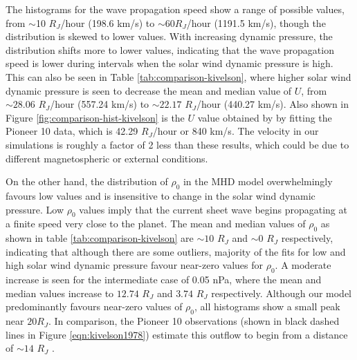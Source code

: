 The histograms for the wave propagation speed show a range of possible values, from $\sim$10 $R_J$/hour (198.6 km/s) to $\sim60 R_J$/hour (1191.5 km/s), though the distribution is skewed to lower values. With increasing dynamic pressure, the distribution shifts more to lower values, indicating that the wave propagation speed is lower during intervals when the solar wind dynamic pressure is high. This can also be seen in Table \ref{tab:comparison-kivelson}, where higher solar wind dynamic pressure is seen to decrease the mean and median value of $U$, from $\sim28.06$ $R_J$/hour (557.24 km/s) to $\sim22.17$ $R_J$/hour (440.27 km/s). Also shown in Figure \ref{fig:comparison-hist-kivelson} is the $U$ value obtained by  by fitting the Pioneer 10 data, which is 42.29 $R_J$/hour or 840 km/s. The velocity in our simulations is roughly a factor of 2 less than these results, which could be due to different magnetospheric or external conditions. 

On the other hand, the distribution of $\rho_0$ in the MHD model overwhelmingly favours low values and is insensitive to change in the solar wind dynamic pressure. Low $\rho_0$ values imply that the current sheet wave begins propagating at a finite speed very close to the planet. The mean and median values of $\rho_0$ as shown in table \ref{tab:comparison-kivelson} are $\sim10$ $R_J$ and $\sim 0$ $R_J$ respectively, indicating that although there are some outliers, majority of the fits for low and high solar wind dynamic pressure favour near-zero values for $\rho_0$. A moderate increase is seen for the intermediate case of 0.05 nPa, where the mean and median values increase to $12.74$ $R_J$ and $3.74$ $R_J$ respectively. Although our model predominantly favours near-zero values of $\rho_0$, all histograms show a small peak near $20R_J$. In comparison, the Pioneer 10 observations (shown in black dashed lines in Figure \ref{eqn:kivelson1978}) estimate this outflow to begin from a distance of $\sim14$ $R_J$ \cite{Kivelson1978ASheet}.  

